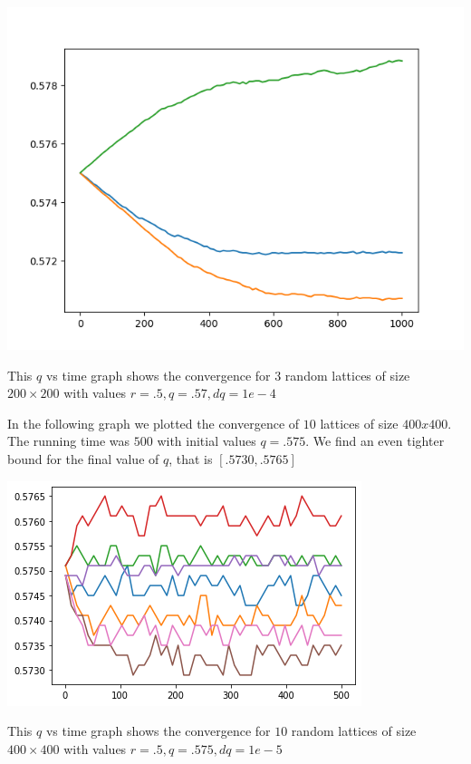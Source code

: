 \documentclass[article, 11pt, a4paper, onesize]{memoir}
\begin{document}
\begin{minipage}{.7\linewidth}
    \begin{center}
    \includegraphics[width=.9\linewidth]{q_converges_L200_q575_r5_num3_dq1e-5.png}
    \end{center}
\end{minipage}\hfill%
\begin{minipage}{.29\linewidth}
    This \(q\) vs time graph shows the convergence for \(3\) random lattices of size
    \(200\times 200\) with values \(r=.5, q=.57, dq = 1e-4\)
\end{minipage}

In the following graph we plotted the convergence of \(10\) lattices of size \(400x400\).
The running time was \(500\) with initial values \(q=.575\). We find an even tighter
bound for the final value of \(q\), that is \([.5730, .5765]\)

\begin{minipage}{.7\linewidth}
    \begin{center}
    \includegraphics[width=.9\linewidth]{400x400.png}
    \end{center}
\end{minipage}\hfill%
\begin{minipage}{.29\linewidth}
    This \(q\) vs time graph shows the convergence for \(10\) random lattices of size
    \(400\times 400\) with values \(r=.5, q=.575, dq = 1e-5\)
\end{minipage}
\end{document}
